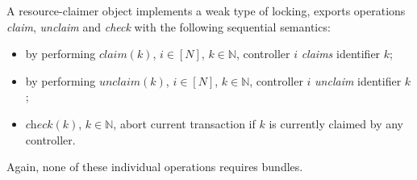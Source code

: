 \documentclass[conference]{sigcomm-alternate}
\newcommand{\Nat}{\mathbb{N}}
\newcommand{\claimcheck}{check\xspace}
\begin{document}
A resource-claimer object implements a weak type of locking, exports operations \emph{claim},
\emph{unclaim} and \emph{\claimcheck} with the following sequential
semantics:

\begin{itemize}
\item by performing $\textit{claim}(k)$, $i\in[N]$,
  $k\in\Nat$, controller $i$ \emph{claims}
  identifier $k$;


\item by performing $\textit{unclaim}(k)$, $i\in[N]$, $k\in\Nat$, controller $i$
  \emph{unclaim} identifier $k$;

\item $\textit{\claimcheck}(k)$, $k\in\Nat$,
abort current transaction if $k$ is currently claimed by any controller.

\end{itemize}

Again, none of these individual operations 
requires bundles.
\end{document}
